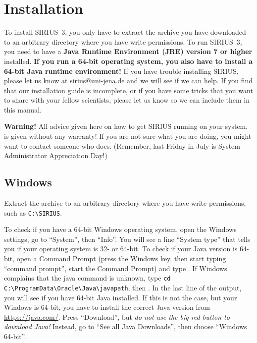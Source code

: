 \documentclass[letterpaper,10pt,openany,oneside]{sphinxmanual}
\begin{document}

\chapter{Installation}
\label{install:installation}\label{install::doc}\label{install:user-interface}

To install SIRIUS~3, you only have to extract the archive you have downloaded
to an arbitrary directory where you have write permissions.  To run SIRIUS~3,
you need to have a \textbf{Java Runtime Environment (JRE) version 7 or
higher} installed.  \textbf{If you run a 64-bit operating system, you also
have to install a 64-bit Java runtime environment!}  If you have trouble
installing SIRIUS, please let us know at \url{sirius@uni-jena.de} and we will
see if we can help.  If you find that our installation guide is incomplete,
or if you have some tricks that you want to share with your fellow
scientists, please let us know so we can include them in this manual.

\textbf{Warning!}  All advice given here on how to get SIRIUS running on your
system, is given without any warranty!  If you are not sure what you are
doing, you might want to contact someone who does.  (Remember, last Friday in
July is System Administrator Appreciation Day!)



\section{Windows}
\label{install:windows}

Extract the archive to an arbitrary directory where you have write
permissions, such as \verb|C:\SIRIUS|.

To check if you have a 64-bit Windows operating system, open the Windows
settings, go to ``System'', then ``Info''.  You will see a line ``System
type'' that tells you if your operating system is 32- or 64-bit.  To check if
your Java version is 64-bit, open a Command Prompt (press the Windows key,
then start typing ``command prompt'', start the Command Prompt) and
type .  If Windows complains that the java command is
unknown, type
\verb!cd C:\ProgramData\Oracle\Java\javapath!,
then .  In the last line of the output, you will see if
you have 64-bit Java installed.  If this is not the case, but your Windows is
64-bit, you have to install the correct Java version
from \url{https://java.com/}.  Press ``Download'', but \emph{do not use the
big red button to download Java!}  Instead, go to ``See all Java Downloads'',
then choose ``Windows 64-bit''.
\end{document}

